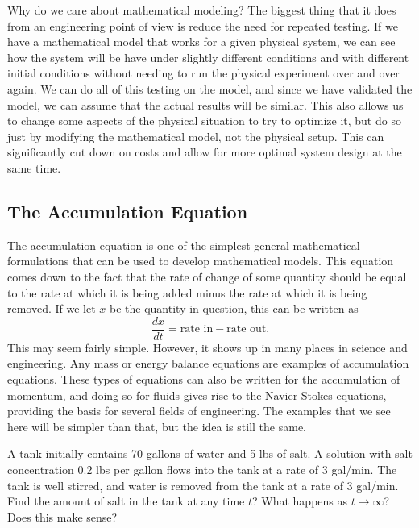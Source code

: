 \documentclass{ximera}
\begin{document}
Why do we care about mathematical modeling? The biggest thing that it does from an engineering point of view is reduce the need for repeated testing. If we have a mathematical model that works for a given physical system, we can see how the system will be have under slightly different conditions and with different initial conditions without needing to run the physical experiment over and over again. We can do all of this testing on the model, and since we have validated the model, we can assume that the actual results will be similar. This also allows us to change some aspects of the physical situation to try to optimize it, but do so just by modifying the mathematical model, not the physical setup. This can significantly cut down on costs and allow for more optimal system design at the same time.

\subsection{The Accumulation Equation}

The accumulation equation is one of the simplest general mathematical formulations that can be used to develop mathematical models. This equation comes down to the fact that the rate of change of some quantity should be equal to the rate at which it is being added minus the rate at which it is being removed. If we let $x$ be the quantity in question, this can be written as
\begin{equation}
    \frac{dx}{dt} = \text{rate in} - \text{rate out}.
    \label{accum:eqn}
\end{equation}
This may seem fairly simple. However, it shows up in many places in science and engineering. Any mass or energy balance equations are examples of accumulation equations. These types of equations can also be written for the accumulation of momentum, and doing so for fluids gives rise to the Navier-Stokes equations, providing the basis for several fields of engineering. The examples that we see here will be simpler than that, but the idea is still the same. 

\begin{example}
    A tank initially contains 70 gallons of water and 5 lbs of salt. A solution with salt concentration 0.2 lbs per gallon flows into the tank at a rate of $3$ gal/min. The tank is well stirred, and water is removed from the tank at a rate of $3$ gal/min. Find the amount of salt in the tank at any time $t$? What happens as $t\rightarrow \infty$? Does this make sense?
\end{example}
\end{document}
